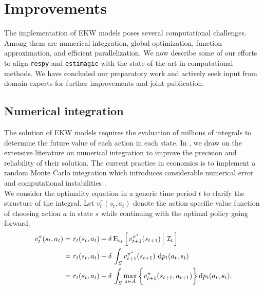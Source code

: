 \section{Improvements}\label{Computation}
The implementation of EKW models poses several computational challenges. Among them are numerical integration, global optimization, function approximation, and efficient parallelization. We now describe some of our efforts to align \verb+respy+ and \verb+estimagic+ with the state-of-the-art in computational methods. We have concluded our preparatory work and actively seek input from domain experts for further improvements and joint publication.
\subsection{Numerical integration}
The solution of EKW models requires the evaluation of millions of integrals to determine the future value of each action in each state. In \citet{Gabler.2020a}, we draw on the extensive literature on numerical integration \citep{Davis.2007, Gerstner.1998} to improve the precision and reliability of their solution. The current practice in economics is to implement a random Monte Carlo integration which introduces considerable numerical error and computational instabilities \citep{Judd.2011}.\\

\noindent We consider the optimality equation in a generic time period $t$ to clarify the structure of the integral. Let $v^{\pi}_{t}(s_t, a_t)$ denote the action-specific value function of choosing action $a$ in state $s$ while continuing with the optimal policy going forward.
%
\begin{align*}
v^{\pi}_{t}(s_t, a_t) & = r_t(s_t, a_t) + \delta\,\mathrm{E}_{s_t} \left[\left.v^{\pi^*}_{t + 1}(s_{t + 1})\,\right\vert\,\mathcal{I}_t\,\right] \\
& =  r_t(s_t, a_t) + \delta\, \int_S v^{\pi^*}_{t + 1}(s_{t + 1})\, \mathop{}\!\mathrm{d} p_t(a_t, s_t)\\
& =  r_t(s_t, a_t) + \delta\, \int_S \max_{a \in A}\bigg\{v^\pi_{t + 1}(s_{t + 1}, a_{t + 1})\bigg\}\mathop{}\!\mathrm{d} p_t(a_t, s_t).
\end{align*}

